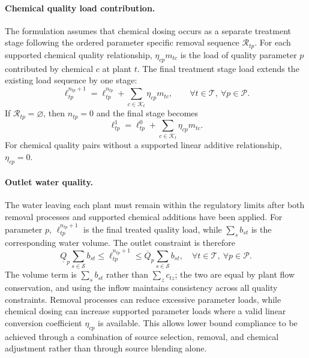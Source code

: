 \documentclass[10pt]{article}
\begin{document}
\paragraph{Chemical quality load contribution.}
The formulation assumes that chemical dosing occurs as a separate treatment stage following the ordered parameter specific removal sequence $\mathcal{R}_{tp}$.
For each supported chemical quality relationship, $\eta_{cp}m_{tc}$ is the load of quality parameter $p$ contributed by chemical $c$ at plant $t$.
The final treatment stage load extends the existing load sequence by one stage:
\begin{equation}\label{eq:final_treatment_load}
    \ell^{n_{tp}+1}_{tp}
    =
    \ell^{n_{tp}}_{tp}
    +
    \sum_{c \in \mathcal{K}_t} \eta_{cp} m_{tc},
    \qquad
    \forall t \in \mathcal{T},\ \forall p \in \mathcal{P}.
\end{equation}
If $\mathcal{R}_{tp}=\varnothing$, then $n_{tp}=0$ and the final stage becomes
\[
\ell^1_{tp}
=
\ell^0_{tp}
+
\sum_{c\in\mathcal{K}_t}\eta_{cp}m_{tc}.
\]
For chemical quality pairs without a supported linear additive relationship, $\eta_{cp}=0$.

\paragraph{Outlet water quality.}
The water leaving each plant must remain within the regulatory limits after both removal processes and supported chemical additions have been applied.
For parameter $p$, $\ell^{n_{tp}+1}_{tp}$ is the final treated quality load, while $\sum_s b_{st}$ is the corresponding water volume.
The outlet constraint is therefore
\begin{equation}\label{eq:outlet_water_quality}
    \underline{Q}_p \sum_{s \in \mathcal{S}} b_{st}
    \le
    \ell^{n_{tp}+1}_{tp}
    \le
    \overline{Q}_p \sum_{s \in \mathcal{S}} b_{st},
    \quad
    \forall t \in \mathcal{T},\ \forall p \in \mathcal{P}.
\end{equation}
The volume term is $\sum_s b_{st}$ rather than $\sum_z c_{tz}$; the two are equal by plant flow conservation, and using the inflow maintains consistency across all quality constraints.
Removal processes can reduce excessive parameter loads, while chemical dosing can increase supported parameter loads where a valid linear conversion coefficient $\eta_{cp}$ is available.
This allows lower bound compliance to be achieved through a combination of source selection, removal, and chemical adjustment rather than through source blending alone.
\end{document}

